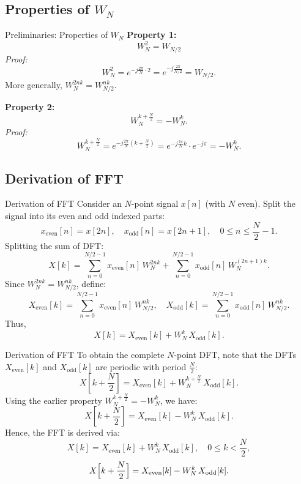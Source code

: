 \documentclass[10pt]{beamer}
\begin{document}
\subsection{Properties of \(W_N\)}
\begin{frame}{Preliminaries: Properties of \(W_N\)}
  \textbf{Property 1:} 
  \[
  W_N^2 = W_{N/2}
  \]
  \vspace{0.5em}
  \textit{Proof:}
  \[
  W_N^2 = e^{-j\frac{2\pi}{N}\cdot 2} = e^{-j\frac{2\pi}{N/2}} = W_{N/2}.
  \]
  More generally, \(W_N^{2nk} = W_{N/2}^{nk}\).
  \vspace{1em}
  
  \textbf{Property 2:}
  \[
  W_N^{k+\frac{N}{2}} = -W_N^k.
  \]
  \vspace{0.5em}
  \textit{Proof:}
  \[
  W_N^{k+\frac{N}{2}} = e^{-j\frac{2\pi}{N}\left(k+\frac{N}{2}\right)}
  = e^{-j\frac{2\pi}{N}k} \cdot e^{-j\pi} = -W_N^k.
  \]
\end{frame}

\subsection{Derivation of FFT}
\begin{frame}{Derivation of FFT}
  Consider an \(N\)-point signal \(x[n]\) (with \(N\) even). Split the signal into its even and odd indexed parts:
  \[
  x_{\text{even}}[n] = x[2n], \quad x_{\text{odd}}[n] = x[2n+1], \quad 0 \le n \le \frac{N}{2}-1.
  \]
  Splitting the sum of DFT:
  \[
  X[k] = \sum_{n=0}^{N/2-1} x_{\text{even}}[n]\, W_N^{2nk} + \sum_{n=0}^{N/2-1} x_{\text{odd}}[n]\, W_N^{(2n+1)k}.
  \]
  Since \(W_N^{2nk} = W_{N/2}^{nk}\), define:
  \[
  X_{\text{even}}[k] = \sum_{n=0}^{N/2-1} x_{\text{even}}[n]\, W_{N/2}^{nk}, \quad
  X_{\text{odd}}[k] = \sum_{n=0}^{N/2-1} x_{\text{odd}}[n]\, W_{N/2}^{nk}.
  \]
  Thus,
  \[
  X[k] = X_{\text{even}}[k] + W_N^k\, X_{\text{odd}}[k].
  \]
\end{frame}

\begin{frame}{Derivation of FFT}
  To obtain the complete \(N\)-point DFT, note that the DFTs \(X_{\text{even}}[k]\) and \(X_{\text{odd}}[k]\) are periodic with period \(\frac{N}{2}\):
  \[
  X[k+\frac{N}{2}] = X_{\text{even}}[k] + W_N^{k+\frac{N}{2}}\, X_{\text{odd}}[k].
  \]
  Using the earlier property \(W_N^{k+\frac{N}{2}} = -W_N^k\), we have:
  \[
  X[k+\frac{N}{2}] = X_{\text{even}}[k] - W_N^k\, X_{\text{odd}}[k].
  \]
  Hence, the FFT is derived via:
  \[
  X[k] = X_{\text{even}}[k] + W_N^k\, X_{\text{odd}}[k], \quad 0 \le k < \frac{N}{2},
  \]
  \[
  X\Bigl[k+\frac{N}{2}\Bigr] = X_{\text{even}}[k] - W_N^k\, X_{\text{odd}}[k].
  \]
\end{frame}
\end{document}
